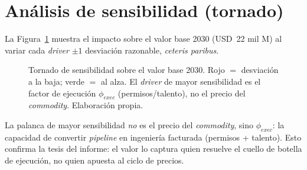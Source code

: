 \documentclass[11pt,letterpaper]{report}
\begin{document}
\section{Análisis de sensibilidad (tornado)}
La Figura~\ref{fig:tornado} muestra el impacto sobre el valor base 2030 (USD~22 mil M) al variar cada \emph{driver}
$\pm 1$ desviación razonable, \emph{ceteris paribus}.
\begin{figure}[htbp]
\centering
{}
\caption[Análisis de sensibilidad tornado]{Tornado de sensibilidad sobre el valor base 2030. Rojo $=$ desviación a la baja;
verde $=$ al alza. El \emph{driver} de mayor sensibilidad es el factor de ejecución $\phi_{exec}$ (permisos/talento), no el precio
del \emph{commodity}. Elaboración propia.}
\label{fig:tornado}
\end{figure}

\begin{cajahallazgo}
La palanca de mayor sensibilidad \emph{no} es el precio del \emph{commodity}, sino $\phi_{exec}$: la capacidad de convertir
\emph{pipeline} en ingeniería facturada (permisos + talento). Esto confirma la tesis del informe: el valor lo captura quien
resuelve el cuello de botella de ejecución, no quien apuesta al ciclo de precios.
\end{cajahallazgo}
\end{document}
